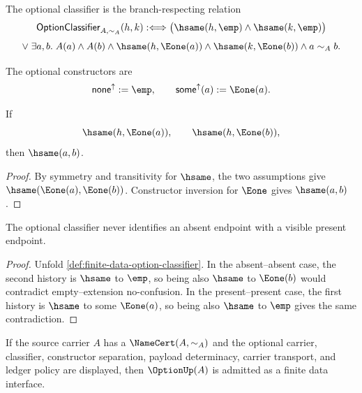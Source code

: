 \begin{definition}
\label{def:finite-data-option-classifier}
The optional classifier is the branch-respecting relation
$$
\mathsf{OptionClassifier}_{A,\sim_A}(h,k)
:\Longleftrightarrow
\bigl(\hsame(h,\emp)\wedge\hsame(k,\emp)\bigr)
$$
$$
\vee\;
\exists a,b.\;
A(a)\wedge A(b)\wedge
\hsame(h,\Eone(a))\wedge
\hsame(k,\Eone(b))\wedge
a\sim_A b.
$$
\end{definition}

\begin{definition}
\label{def:finite-data-option-constructors}
The optional constructors are
$$
\mathsf{none}^{\uparrow}:=\emp,
\qquad
\mathsf{some}^{\uparrow}(a):=\Eone(a).
$$
\end{definition}

\begin{theorem}
\label{thm:finite-data-option-present-payload-determinacy}
If
$$
\hsame(h,\Eone(a)),
\qquad
\hsame(h,\Eone(b)),
$$
then $\hsame(a,b)$.
\end{theorem}

\begin{proof}
By symmetry and transitivity for $\hsame$, the two assumptions give
$\hsame(\Eone(a),\Eone(b))$.  Constructor inversion for $\Eone$ gives
$\hsame(a,b)$.
\end{proof}

\begin{theorem}
\label{thm:finite-data-option-absent-present-separation}
The optional classifier never identifies an absent endpoint with a visible
present endpoint.
\end{theorem}

\begin{proof}
Unfold \autoref{def:finite-data-option-classifier}.  In the absent--absent
case, the second history is $\hsame$ to $\emp$, so being also $\hsame$ to
$\Eone(b)$ would contradict empty--extension no-confusion.  In the
present--present case, the first history is $\hsame$ to some $\Eone(a)$, so
being also $\hsame$ to $\emp$ gives the same contradiction.
\end{proof}

\begin{corollary}
\label{cor:finite-data-option-admission}
If the source carrier $A$ has a $\NameCert(A,\sim_A)$ and the optional
carrier, classifier, constructor separation, payload determinacy, carrier
transport, and ledger policy are displayed, then $\OptionUp(A)$ is admitted
as a finite data interface.
\end{corollary}

